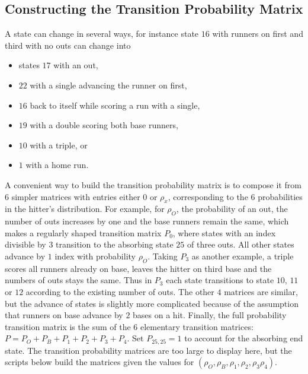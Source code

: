 \documentclass[12pt]{article}
\begin{document}
\subsection*{Constructing the Transition Probability Matrix} A state can
change in several ways, for instance state \( 16 \) with runners on
first and third with no outs can change into
\begin{itemize}
    \item
        states \( 17 \) with an out,
    \item
        \( 22 \) with a single advancing the runner on first,
    \item
        \( 16 \) back to itself while scoring a run with a single,
    \item
        \( 19 \) with a double scoring both base runners,
    \item
        \( 10 \) with a triple, or
    \item
        \( 1 \) with a home run.
\end{itemize}
A convenient way to build the transition probability matrix is to
compose it from \( 6 \) simpler matrices with entries either \( 0 \) or \(
\rho_x \), corresponding to the \( 6 \) probabilities in the hitter's
distribution.  For example, for \( \rho_O \), the probability of an out,
the number of outs increases by one and the base runners remain the
same, which makes a regularly shaped transition matrix \( P_0 \), where
states with an index divisible by \( 3 \) transition to the absorbing
state \( 25 \) of three outs.  All other states advance by \( 1 \) index
with probability \( \rho_O \).  Taking \( P_3 \) as another example, a
triple scores all runners already on base, leaves the hitter on third
base and the numbers of outs stays the same. Thus in \( P_3 \) each
state transitions to state \( 10 \), \( 11 \) or \( 12 \) according to
the existing number of outs.  The other \( 4 \) matrices are similar,
but the advance of states is slightly more complicated because of the
assumption that runners on base advance by \( 2 \) bases on a hit.
Finally, the full probability transition matrix is the sum of the \( 6 \)
elementary transition matrices:  \( P = P_O + P_B + P_1 + P_2 + P_3 + P_4
\).  Set \( P_{25, 25} = 1 \) to account for the absorbing end state.
The transition probability matrices are too large to display here, but
the scripts below build the matrices given the values for \( (\rho_O,
\rho_B, \rho_1, \rho_2, \rho_3 \rho_4) \).
\end{document}
